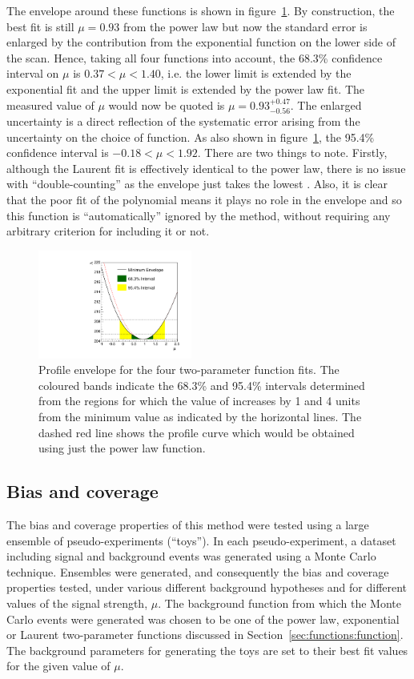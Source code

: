 The envelope around these functions is shown in
figure~\ref{fig:functions:envelope}.
By construction, the best fit is still $\mu=0.93$ from the power law
but now the standard error is enlarged by the contribution from the exponential function
on the lower side of the scan. Hence, taking all four functions into
account, the 68.3\% confidence interval on $\mu$ is
$0.37 < \mu < 1.40 $, i.e. the lower limit is extended by
the exponential fit and the upper limit is extended by the power law fit.
The measured value of $\mu$ would now be quoted is
$\mu = 0.93_{-0.56}^{+0.47}$.
The enlarged uncertainty is a direct reflection of the
systematic error arising from the uncertainty on the choice of function.
As also shown in figure~\ref{fig:functions:envelope}, the 95.4\% confidence
interval is $-0.18 < \mu < 1.92$.
There are two things to note. Firstly, although the Laurent fit
is effectively identical to the power law, there is no issue with
``double-counting'' as the envelope just takes the lowest \nll.
Also, it is clear that the poor fit of the polynomial
means it plays no role in the envelope and so this function is
``automatically'' ignored by the method,
without requiring any arbitrary criterion for
including it or not.
%
\begin{figure}[tbp]
\centering
\includegraphics[width=0.45\textwidth]{functions/Envelope.pdf}
\caption{Profile \nll envelope for the four two-parameter function fits.
The coloured bands indicate the 68.3\% and 95.4\% intervals determined from the regions
for which the value of \nll increases by 1 and 4 units from the minimum value as indicated by the horizontal lines. The dashed red line shows the profile \nll
curve which would be obtained using just the power law function.}
\label{fig:functions:envelope}
\end{figure}


\subsection{Bias and coverage}
\label{sec:functions:coverage}

The bias and coverage properties of this method were tested
using a large ensemble of
pseudo-experiments (``toys''). In each pseudo-experiment, a
dataset including signal and background events was generated using a Monte Carlo technique.
Ensembles were generated, and consequently the bias and coverage properties tested, under various different background hypotheses and for different values of the signal strength, $\mu$. The background function from which the Monte Carlo events were generated was chosen to be one of the power law,
exponential or Laurent two-parameter functions discussed in
Section~\ref{sec:functions:function}. The background parameters for generating the toys are set to their best fit values for the given value of $\mu$.

